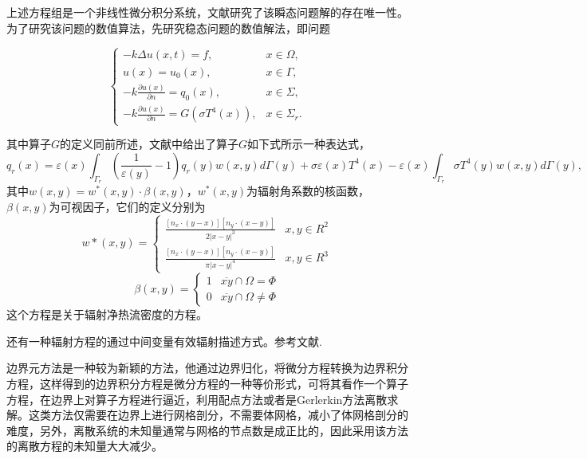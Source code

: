 上述方程组是一个非线性微分积分系统，文献\cite{druet2010weak}研究了该瞬态问题解的存在唯一性。为了研究该问题的数值算法，先研究稳态问题的数值解法，即问题

\begin{equation}
	\begin{cases}
		 - k \Delta u(x,t) = f,              &x\in\Omega, \\
		u(x) = u_0(x),                          & x\in\Gamma,\\
		- k \frac{\partial u(x)}{\partial n} = q_0(x), & x \in  \Sigma,\\
		- k \frac{\partial u(x)}{\partial n} = G(\sigma T^4(x)) , &x \in \Sigma_r.
		\end{cases}
	\label{eq:main}
\end{equation}

其中算子$G$的定义同前所述，文献\cite{modest2003}中给出了算子$G$如下式所示一种表达式，
\begin{equation}
  {q_r}(x) = \varepsilon (x)\int_{{\Gamma _r}} {\left( {\frac{1}{{\varepsilon (y)}} - 1} \right){q_r}(y)w(x,y)d\Gamma (y)}+ \sigma \varepsilon (x){T^4}(x) - \varepsilon (x)\int_{{\Gamma _r}} {\sigma {T^4}(y)w(x,y)d\Gamma (y)} , 
\end{equation}
其中$w(x,y)=w^*(x,y)\cdot \beta (x,y)$，$w^*(x,y)$为辐射角系数的核函数，$\beta (x,y)$为可视因子，它们的定义分别为
\[w*(x,y) = \left\{ {\begin{array}{*{20}{c}}
  {\frac{{\left[ {{n_x} \cdot (y - x)} \right]\left[ {{n_y} \cdot (x - y)} \right]}}{{2|x - y{|^3}}}}&{x,y \in {R^2}} \\ 
  {\frac{{\left[ {{n_x} \cdot (y - x)} \right]\left[ {{n_y} \cdot (x - y)} \right]}}{{\pi |x - y{|^4}}}}&{x,y \in {R^3}} 
\end{array}} \right.\]
\[\beta (x,y) = \left\{ {\begin{array}{*{20}{c}}
  1&{\overline {xy}  \cap \Omega  = \Phi } \\ 
  0&{\overline {xy}  \cap \Omega  \ne \Phi } 
\end{array}} \right.\]
这个方程是关于辐射净热流密度的方程。

还有一种辐射方程的通过中间变量有效辐射描述方式。参考文献\cite{druet2010weak,Tiihonen1997}.


边界元方法是一种较为新颖的方法，他通过边界归化，将微分方程转换为边界积分方程，这样得到的边界积分方程是微分方程的一种等价形式，可将其看作一个算子方程，在边界上对算子方程进行逼近，利用配点方法或者是Gerlerkin方法离散求解。这类方法仅需要在边界上进行网格剖分，不需要体网格，减小了体网格剖分的难度，另外，离散系统的未知量通常与网格的节点数是成正比的，因此采用该方法的离散方程的未知量大大减少。

